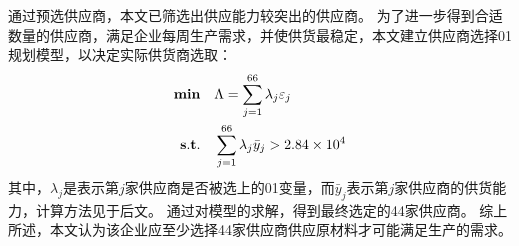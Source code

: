 通过预选供应商，本文已筛选出供应能力较突出的供应商。
为了进一步得到合适数量的供应商，满足企业每周生产需求，并使供货最稳定，本文建立供应商选择0\textendash1规划模型，以决定实际供货商选取：
\begin{equation}
\begin{split}
{\bf min}\quad &\Lambda=\sum_{j=1}^{66} \lambda_j\varepsilon_j \\
{\bf s.t.}\quad &\sum_{j=1}^{66} \lambda_j\bar{y}_j > 2.84\times 10^4
\end{split}
\end{equation}
其中，$\lambda_j$是表示第$j$家供应商是否被选上的0\textendash1变量，而$\bar{y}_j$表示第$j$家供应商的供货能力，计算方法见于后文。
通过对模型的求解，得到最终选定的44家供应商。
综上所述，本文认为该企业应至少选择44家供应商供应原材料才可能满足生产的需求。
